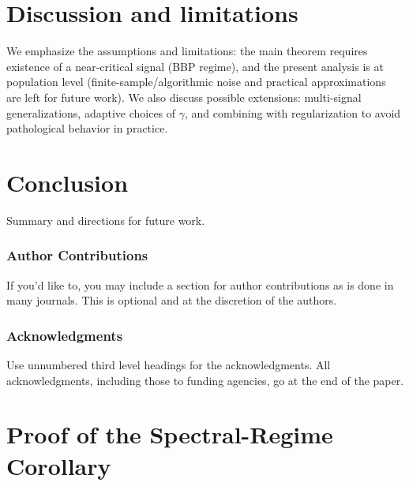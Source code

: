 \section{Discussion and limitations}
\label{sec:discussion}

We emphasize the assumptions and limitations: the main theorem requires existence of a near-critical signal (BBP regime), and the present analysis is at population level (finite-sample/algorithmic noise and practical approximations are left for future work). We also discuss possible extensions: multi-signal generalizations, adaptive choices of $\gamma$, and combining with regularization to avoid pathological behavior in practice.

\section{Conclusion}
\label{sec:conclusion}
Summary and directions for future work.

\medskip




\subsubsection*{Author Contributions}
If you'd like to, you may include  a section for author contributions as is done
in many journals. This is optional and at the discretion of the authors.

\subsubsection*{Acknowledgments}
Use unnumbered third level headings for the acknowledgments. All
acknowledgments, including those to funding agencies, go at the end of the paper.





\appendix


\section{Proof of the Spectral-Regime Corollary}
\label{app:corollary_proof}

